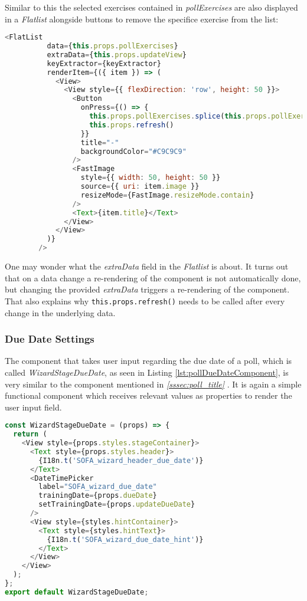Similar to this the selected exercises contained in \textit{pollExercises} are also displayed in a \textit{Flatlist} alongside buttons to remove the specifice exercise from the list:
\begin{lstlisting}[language=javascript, caption=Flatlist Selected, label=lst:selectListSelected]
        <FlatList
          data={this.props.pollExercises}
          extraData={this.props.updateView}
          keyExtractor={keyExtractor}
          renderItem={({ item }) => (
            <View>
              <View style={{ flexDirection: 'row', height: 50 }}>
                <Button
                  onPress={() => {
                    this.props.pollExercises.splice(this.props.pollExercises.indexOf(item), 1)
                    this.props.refresh()
                  }}
                  title="-"
                  backgroundColor="#C9C9C9"
                />
                <FastImage
                  style={{ width: 50, height: 50 }}
                  source={{ uri: item.image }}
                  resizeMode={FastImage.resizeMode.contain}
                />
                <Text>{item.title}</Text>
              </View>
            </View>
          )}
        />
\end{lstlisting}
One may wonder what the \textit{extraData} field in the \textit{Flatlist} is about. It turns out that on a data change a re-rendering of the component is not automatically done, but changing the provided \textit{extraData} triggers a re-rendering of the component. That also explains why \lstinline{this.props.refresh()} needs to be called after every change in the underlying data.

\subsubsection{Due Date Settings}
\label{sssec:poll_due_date}

The component that takes user input regarding the due date of a poll, which is called \textit{WizardStageDueDate}, as seen in Listing \ref{lst:pollDueDateComponent}, is very similar to the component mentioned in \textit{\ref{sssec:poll_title} }. It is again a simple functional component which receives relevant values as properties to render the user input field.

\begin{lstlisting}[language=javascript,caption=Simplified Poll Due Date Component,label=lst:pollDueDateComponent]
const WizardStageDueDate = (props) => {
  return (
    <View style={props.styles.stageContainer}>
      <Text style={props.styles.header}>
        {I18n.t('SOFA_wizard_header_due_date')}
      </Text>
      <DateTimePicker
        label="SOFA_wizard_due_date"
        trainingDate={props.dueDate}
        setTrainingDate={props.updateDueDate}
      />
      <View style={styles.hintContainer}>
        <Text style={styles.hintText}>
          {I18n.t('SOFA_wizard_due_date_hint')}
        </Text>
      </View>
    </View>
  );
};
export default WizardStageDueDate;
\end{lstlisting}

